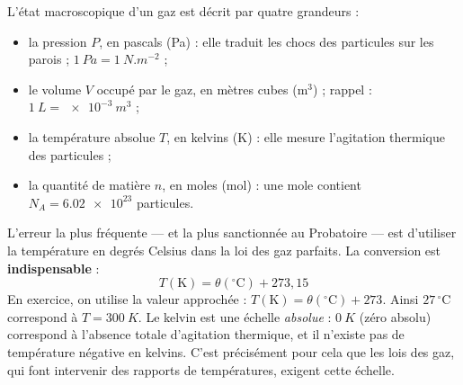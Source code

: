 \documentclass[11pt]{article}
\newcommand{\cle}[1]{{\popxbold\color{popdark}#1}}
\begin{document}
\begin{definition}
L'état macroscopique d'un gaz est décrit par quatre grandeurs :
\begin{itemize}
\item la \cle{pression} $P$, en pascals (Pa) : elle traduit les chocs des particules sur les parois ; $\SI{1}{Pa} = \SI{1}{N.m^{-2}}$ ;
\item le \cle{volume} $V$ occupé par le gaz, en mètres cubes ($\text{m}^3$) ; rappel : $\SI{1}{L} = \SI{e-3}{m^3}$ ;
\item la \cle{température absolue} $T$, en kelvins (K) : elle mesure l'agitation thermique des particules ;
\item la \cle{quantité de matière} $n$, en moles (mol) : une mole contient $N_A = \num{6,02e23}$ particules.
\end{itemize}
\end{definition}

\begin{attention}
L'erreur la plus fréquente — et la plus sanctionnée au Probatoire — est d'utiliser la température en degrés Celsius dans la loi des gaz parfaits. La conversion est \textbf{indispensable} :
\[ T(\text{K}) = \theta(^\circ\text{C}) + 273,15 \]
En exercice, on utilise la valeur approchée : $T(\text{K}) = \theta(^\circ\text{C}) + 273$. Ainsi $27\,^\circ\text{C}$ correspond à $T = \SI{300}{K}$. Le kelvin est une échelle \emph{absolue} : $\SI{0}{K}$ (zéro absolu) correspond à l'absence totale d'agitation thermique, et il n'existe pas de température négative en kelvins. C'est précisément pour cela que les lois des gaz, qui font intervenir des rapports de températures, exigent cette échelle.
\end{attention}
\end{document}

